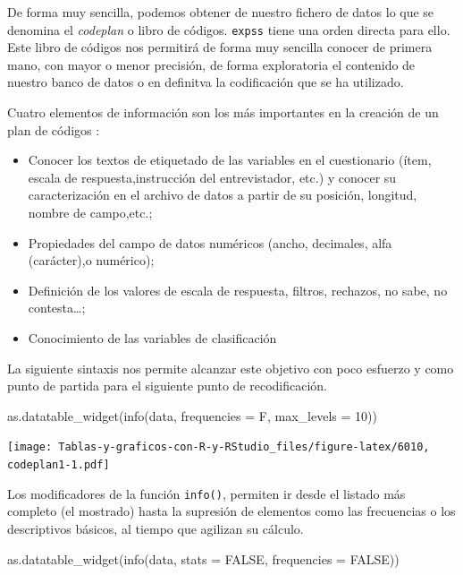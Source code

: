 \documentclass[
]{book}
\newenvironment{Shaded}{\begin{snugshade}}{\end{snugshade}}
\newcommand{\AttributeTok}[1]{\textcolor[rgb]{0.77,0.63,0.00}{#1}}
\newcommand{\ConstantTok}[1]{\textcolor[rgb]{0.00,0.00,0.00}{#1}}
\newcommand{\DecValTok}[1]{\textcolor[rgb]{0.00,0.00,0.81}{#1}}
\newcommand{\FunctionTok}[1]{\textcolor[rgb]{0.00,0.00,0.00}{#1}}
\newcommand{\NormalTok}[1]{#1}
\providecommand{\tightlist}{%
  \setlength{\itemsep}{0pt}\setlength{\parskip}{0pt}}
\begin{document}
De forma muy sencilla, podemos obtener de nuestro fichero de datos lo que se denomina el \emph{codeplan} \citep{mohler2008survey} o libro de códigos. \texttt{expss} tiene una orden directa para ello. Este libro de códigos nos permitirá de forma muy sencilla conocer de primera mano, con mayor o menor precisión, de forma exploratoria el contenido de nuestro banco de datos o en definitva la codificación que se ha utilizado.

Cuatro elementos de información son los más importantes en la creación de un plan de códigos \citep{mohler2008survey}:

\begin{itemize}
\tightlist
\item
  Conocer los textos de etiquetado de las variables en el cuestionario (ítem, escala de respuesta,instrucción del entrevistador, etc.) y conocer su caracterización en el archivo de datos a partir de su posición, longitud, nombre de campo,etc.;
\item
  Propiedades del campo de datos numéricos (ancho, decimales, alfa (carácter),o numérico);
\item
  Definición de los valores de escala de respuesta, filtros, rechazos, no sabe, no contesta\ldots;
\item
  Conocimiento de las variables de clasificación
\end{itemize}

La siguiente sintaxis nos permite alcanzar este objetivo con poco esfuerzo y como punto de partida para el siguiente punto de recodificación.

\begin{Shaded}
\begin{Highlighting}[]
\FunctionTok{as.datatable\_widget}\NormalTok{(}\FunctionTok{info}\NormalTok{(data, }\AttributeTok{frequencies =}\NormalTok{ F, }\AttributeTok{max\_levels =} \DecValTok{10}\NormalTok{))}
\end{Highlighting}
\end{Shaded}

\texttt{[image: Tablas-y-graficos-con-R-y-RStudio\_files/figure-latex/6010, codeplan1-1.pdf]}

Los modificadores de la función \texttt{info()}, permiten ir desde el listado más completo (el mostrado) hasta la supresión de elementos como las frecuencias o los descriptivos básicos, al tiempo que agilizan su cálculo.

\begin{Shaded}
\begin{Highlighting}[]
\FunctionTok{as.datatable\_widget}\NormalTok{(}\FunctionTok{info}\NormalTok{(data, }\AttributeTok{stats =} \ConstantTok{FALSE}\NormalTok{, }\AttributeTok{frequencies =} \ConstantTok{FALSE}\NormalTok{))}
\end{Highlighting}
\end{Shaded}
\end{document}

